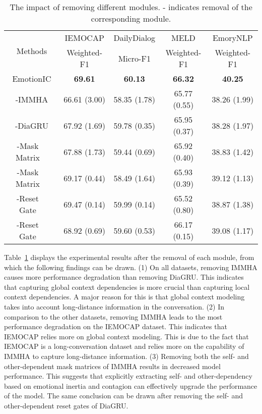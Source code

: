 \documentclass{SCIS2019}
\begin{document}
\begin{table}[htbp]
	\centering	
	\caption{The impact of removing different modules. - indicates removal of the corresponding module.}
	\label{tab:modules}	
	\renewcommand{\arraystretch}{1.0}
	\setlength{\tabcolsep}{9pt}	
	\begin{tabular}{cc|c|c|c|c}
	\toprule
\multicolumn{2}{c|}{\multirow{2}{*}{Methods}} &\multicolumn{1}{c|}{IEMOCAP}& \multicolumn{1}{c|}{DailyDialog} & \multicolumn{1}{c|}{MELD} & \multicolumn{1}{c}{EmoryNLP}\\
	\cline{3-6}
	& &Weighted-F1 & Micro-F1 &Weighted-F1 &Weighted-F1\\
	\hline
	\multicolumn{2}{c|}{EmotionIC}	 			& \textbf{69.61} & \textbf{60.13} & \textbf{66.32} & \textbf{40.25} \\
	\hline 
	\multicolumn{2}{c|}{-IMMHA}				    & 66.61  (3.00)  &58.35 (1.78)& 65.77 (0.55) &38.26 (1.99)\\ 
	\multicolumn{2}{c|}{-DiaGRU}	          & 67.92  (1.69)&59.78 (0.35)& 65.95  (0.37) &38.28 (1.97)\\
	\hline
	\multicolumn{1}{c|}{-Mask Matrix } &{\multirow{2}{*}{IMMHA}} & 67.88  (1.73)  &59.44 (0.69)& 65.92 (0.40) &38.83 (1.42)\\ 
	\multicolumn{1}{c|}{-Mask Matrix } &  &  69.17 (0.44)  &58.49 (1.64)& 65.93 (0.39) &39.12 (1.13)\\
	\hline
	\multicolumn{1}{c|}{-Reset Gate } &{\multirow{2}{*}{DiaGRU}}& 69.47 (0.14) &59.99 (0.14)& 65.52  (0.80) &38.87 (1.38)\\  	
	\multicolumn{1}{c|}{-Reset Gate } &  &  68.92 (0.69) &59.60 (0.53)& 66.17  (0.15) &39.08 (1.17)\\
	\bottomrule
	\end{tabular}
\end{table}
Table~\ref{tab:modules} displays the experimental results after the removal of each module, from which the following findings can be drawn.
(1) On all datasets, removing IMMHA causes more performance degradation than removing DiaGRU. This indicates that capturing global context dependencies is more crucial than capturing local context dependencies. A major reason for this is that global context modeling takes into account long-distance information in the conversation.
(2) In comparison to the other datasets, removing IMMHA leads to the most performance degradation on the IEMOCAP dataset. This indicates that IEMOCAP relies more on global context modeling. This is due to the fact that IEMOCAP is a long-conversation dataset and relies more on the capability of IMMHA to capture long-distance information.
(3) Removing both the self- and other-dependent mask matrices of IMMHA results in decreased model performance. This suggests that explicitly extracting self- and other-dependency based on emotional inertia and contagion can effectively upgrade the performance of the model. The same conclusion can be drawn after removing the self- and other-dependent reset gates of DiaGRU.
\end{document}
